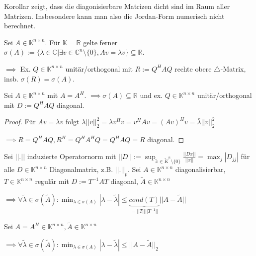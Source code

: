 \begin{remark}
	Korollar zeigt, dass die diagonisierbare Matrizen dicht sind im Raum aller Matrizen. Insbesondere kann man also die Jordan-Form numerisch nicht berechnet.
\end{remark}

\begin{theorem}
	Sei $A \in \mathbb{K}^{n\times n}$. Für $\mathbb{K} = \mathbb{R}$ gelte ferner $\sigma(A) := \{\lambda \in \mathbb{C}| \exists v \in \mathbb{C}^n\setminus\{0\}, Av=\lambda v\} \subseteq \mathbb{R}$.
	
	$\implies$ Ex. $Q \in \mathbb{K}^{n\times n}$ unitär/orthogonal mit $R := Q^HAQ$ rechte obere $\triangle$-Matrix, insb. $\sigma(R) = \sigma(A)$.
\end{theorem}

\begin{corollary}[Spektralzerlegung]
	Sei $A \in \mathbb{K}^{n\times n}$ mit $A=A^H$. $\implies \sigma(A) \subseteq \mathbb{R}$ und ex. $Q \in \mathbb{K}^{n\times n}$ unitär/orthogonal mit $D:=Q^H A Q$ diagonal.
\end{corollary}

\begin{proof}
	Für $Av = \lambda v$ folgt $\lambda ||v||_2^2 = \lambda v^Hv = v^HAv = (Av)^Hv = \bar{\lambda} ||v||_2^2$
	
	$\implies R=Q^HAQ, R^H = Q^HA^HQ = Q^HAQ=R$ diagonal.
\end{proof}

\begin{theorem}
	Sei $||.||$ induzierte Operatornorm mit $||D|| := \sup_{\tilde{x} \in \tilde{K}^n\setminus\{0\}} \frac{||Dx||}{||x||} = \max_j |D_{jj}|$ für alle $D \in \mathbb{K}^{n\times n}$ Diagonalmatrix, z.B. $||.||_p$. Sei $A \in \mathbb{K}^{n\times n}$ diagonalisierbar, $T \in \mathbb{K}^{n\times n}$ regulär mit $D:=T^{-1}AT$ diagonal, $\tilde{A} \in \mathbb{K}^{n\times n}$
	
	$\implies \forall \tilde{\lambda} \in \sigma(\tilde{A}): \min_{\lambda\in\sigma(A)} |\lambda - \tilde{\lambda}| \leq \underbrace{cond(T)}_{= ||T|| ||T^{-1}||} ||A-\tilde{A}||$
\end{theorem}

\begin{corollary}
	Sei $A=A^H \in \mathbb{K}^{n\times n}, \tilde{A} \in \mathbb{K}^{n\times n}$
	
	$\implies \forall \tilde{\lambda} \in \sigma(\tilde{A}): \min_{\lambda \in \sigma(A)} |\lambda - \tilde{\lambda}| \leq ||A - \tilde{A}||_2$
\end{corollary}

